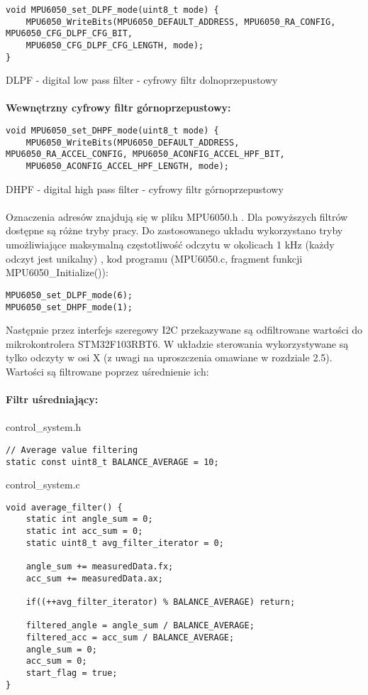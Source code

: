 \documentclass[a4paper,12pt,twoside,openany]{report}
\begin{document}
\begin{lstlisting}[style=customc]
void MPU6050_set_DLPF_mode(uint8_t mode) {
    MPU6050_WriteBits(MPU6050_DEFAULT_ADDRESS, MPU6050_RA_CONFIG, MPU6050_CFG_DLPF_CFG_BIT, 
    MPU6050_CFG_DLPF_CFG_LENGTH, mode);
}
\end{lstlisting}

\noindent DLPF - digital low pass filter - cyfrowy filtr dolnoprzepustowy\\
\\
\noindent\textbf{Wewnętrzny cyfrowy filtr górnoprzepustowy:} 

\begin{lstlisting}[style=customc]
void MPU6050_set_DHPF_mode(uint8_t mode) {
    MPU6050_WriteBits(MPU6050_DEFAULT_ADDRESS, MPU6050_RA_ACCEL_CONFIG, MPU6050_ACONFIG_ACCEL_HPF_BIT, 
    MPU6050_ACONFIG_ACCEL_HPF_LENGTH, mode);
\end{lstlisting}

\noindent DHPF - digital high pass filter - cyfrowy filtr górnoprzepustowy\\
\\
Oznaczenia adresów znajdują się w pliku MPU6050.h \cite{mpureg}. Dla powyższych filtrów dostępne są różne tryby pracy. Do zastosowanego układu wykorzystano tryby umożliwiające maksymalną częstotliwość odczytu w okolicach 1 kHz (każdy odczyt jest unikalny) \cite{mpu}, kod programu (MPU6050.c, fragment funkcji MPU6050\_Initialize()):

\begin{lstlisting}[style=customc]
MPU6050_set_DLPF_mode(6);
MPU6050_set_DHPF_mode(1);
\end{lstlisting}

Następnie przez interfejs szeregowy I2C przekazywane są odfiltrowane wartości do mikrokontrolera STM32F103RBT6. W układzie sterowania wykorzystywane są tylko odczyty w osi X (z uwagi na uproszczenia omawiane w rozdziale 2.5). Wartości są filtrowane poprzez uśrednienie ich: \\
\\
\noindent\textbf{Filtr uśredniający:} \\
\\
\noindent control\_system.h
\begin{lstlisting}[style=customc]
// Average value filtering
static const uint8_t BALANCE_AVERAGE = 10;
\end{lstlisting}
control\_system.c
\begin{lstlisting}[style=customc]
void average_filter() {
	static int angle_sum = 0;
	static int acc_sum = 0;
	static uint8_t avg_filter_iterator = 0;
	
	angle_sum += measuredData.fx;
	acc_sum += measuredData.ax;
	
	if((++avg_filter_iterator) % BALANCE_AVERAGE) return;
	
	filtered_angle = angle_sum / BALANCE_AVERAGE;
	filtered_acc = acc_sum / BALANCE_AVERAGE;
	angle_sum = 0;
	acc_sum = 0;
	start_flag = true;
}
\end{lstlisting}
\end{document}
